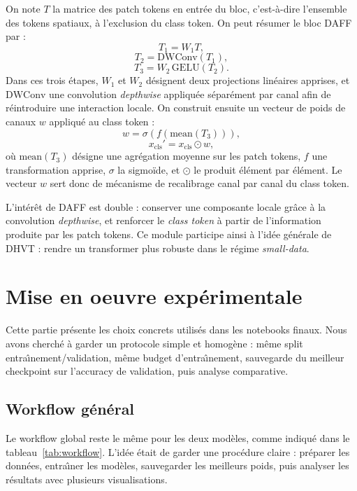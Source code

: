 \documentclass[11pt,a4paper]{article}
\begin{document}
On note $T$ la matrice des patch tokens en entr\'ee du bloc, c'est-\`a-dire l'ensemble des tokens spatiaux, \`a l'exclusion du class token. On peut r\'esumer le bloc DAFF par :
\[
T_1 = W_1 T,
\]
\[
T_2 = \mathrm{DWConv}(T_1),
\]
\[
T_3 = W_2 \, \mathrm{GELU}(T_2).
\]
Dans ces trois \'etapes, $W_1$ et $W_2$ d\'esignent deux projections lin\'eaires apprises, et $\mathrm{DWConv}$ une convolution \textit{depthwise} appliqu\'ee s\'epar\'ement par canal afin de r\'eintroduire une interaction locale. On construit ensuite un vecteur de poids de canaux $w$ appliqu\'e au class token :
\[
w = \sigma(f(\mathrm{mean}(T_3))),
\]
\[
x_{\text{cls}}' = x_{\text{cls}} \odot w,
\]
o\`u $\mathrm{mean}(T_3)$ d\'esigne une agr\'egation moyenne sur les patch tokens, $f$ une transformation apprise, $\sigma$ la sigmo\"ide, et $\odot$ le produit \'el\'ement par \'el\'ement. Le vecteur $w$ sert donc de m\'ecanisme de recalibrage canal par canal du class token.

L'int\'er\^et de DAFF est double : conserver une composante locale gr\^ace \`a la convolution \textit{depthwise}, et renforcer le \textit{class token} \`a partir de l'information produite par les patch tokens. Ce module participe ainsi \`a l'id\'ee g\'en\'erale de DHVT : rendre un transformer plus robuste dans le r\'egime \textit{small-data}.

\section{Mise en oeuvre exp\'erimentale}
Cette partie pr\'esente les choix concrets utilis\'es dans les notebooks finaux. Nous avons cherch\'e \`a garder un protocole simple et homog\`ene : m\^eme split entra\^\i nement/validation, m\^eme budget d'entra\^\i nement, sauvegarde du meilleur checkpoint sur l'accuracy de validation, puis analyse comparative.

\subsection{Workflow g\'en\'eral}
Le workflow global reste le m\^eme pour les deux mod\`eles, comme indiqu\'e dans le tableau~\ref{tab:workflow}. L'id\'ee \'etait de garder une proc\'edure claire : pr\'eparer les donn\'ees, entra\^\i ner les mod\`eles, sauvegarder les meilleurs poids, puis analyser les r\'esultats avec plusieurs visualisations.
\end{document}
